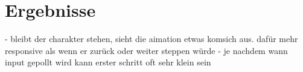 \chapter{Ergebnisse}

- bleibt der charakter stehen, sieht die aimation etwas komsich aus. dafür mehr responsive als wenn er zurück oder weiter steppen würde
- je nachdem wann input gepollt wird kann erster schritt oft sehr klein sein